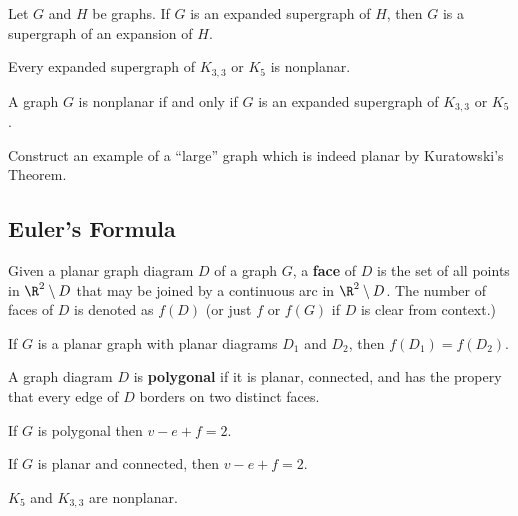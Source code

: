 \begin{theorem} Let $G$ and $H$ be graphs. If $G$ is an expanded supergraph of $H$, then $G$ is a supergraph of an expansion of $H$.
\end{theorem}

\begin{theorem} Every expanded supergraph of $K_{3,3}$ or $K_5$ is nonplanar.
\end{theorem}

\begin{theorem} A graph $G$ is nonplanar if and only if $G$ is an expanded supergraph of $K_{3,3}$ or $K_5$.
\end{theorem}

\begin{example} Construct an example of a ``large'' graph which is indeed planar by Kuratowski's Theorem.
\end{example}

\subsection{Euler's Formula}
\begin{definition} Given a planar graph diagram $D$ of a graph $G$, a \textbf{face} of $D$ is the set of all points in $\R^2 \setminus D$ that may be joined by a continuous arc in $\R^2 \setminus D$.  The number of faces of $D$ is denoted as $f(D)$ (or just $f$ or $f(G)$ if $D$ is clear from context.)
\end{definition}

\begin{theorem} If $G$ is a planar graph with planar diagrams $D_1$ and $D_2$, then $f(D_1) = f(D_2)$.
\end{theorem}

\begin{definition} A graph diagram $D$ is \textbf{polygonal} if it is planar, connected, and has the propery that every edge of $D$ borders on two distinct faces.
\end{definition}

\begin{theorem}[Euler]\label{thm:euler} If $G$ is polygonal then $v-e+f = 2$.
\end{theorem}

\begin{corollary} If $G$ is planar and connected, then $v-e+f = 2$.
\end{corollary}

\begin{corollary} $K_5$ and $K_{3,3}$ are nonplanar.
\end{corollary}


